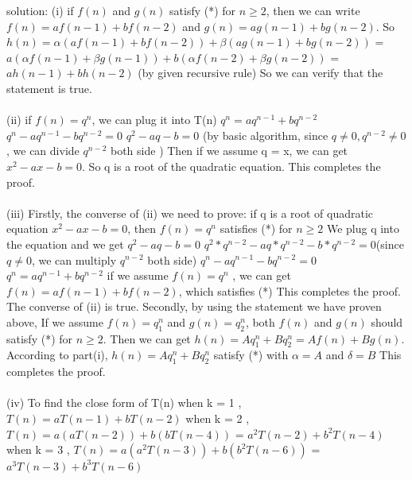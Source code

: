 \documentclass[12pt]{article}
\begin{document}
solution:\vskip5pt
(i) if $f(n)$ and $g(n)$ satisfy (*) for $n\ge 2$, then we can write $f(n) = af(n-1) + bf(n-2)$ and $g(n) = ag(n-1) + b g(n-2)$. \vskip5pt
So $h(n) = \alpha (af(n-1) + bf(n-2)) + \beta (ag(n-1) + b g(n-2)) $ \vskip5pt
\qquad  = $a(\alpha f(n-1) + \beta g(n-1)) + b(\alpha f(n-2) + \beta g(n-2))$\vskip5pt
\qquad  = $ah(n-1) + bh(n-2)$ (by given recursive rule)
So we can verify that the statement is true.
\\[2ex]
\\[2ex]
(ii) if $f(n) = q^n$, we can plug it into T(n)\vskip5pt
\qquad \qquad $q^n = aq^{n-1} + bq^{n-2}$\vskip5pt
\qquad \qquad $q^n - aq^{n-1} - bq^{n-2} = 0$ \vskip5pt
\qquad \qquad $q^2 - aq - b = 0$ (by basic algorithm, since $q \ne 0, q^{n-2} \ne 0$, we can divide $q^{n-2}$ both side )\vskip5pt
Then if we assume q = x, we can get $x^2 - ax - b = 0$. So q is a root of the quadratic equation. This completes the proof.
\\[2ex]
\\[2ex]
(iii) Firstly, the converse of (ii) we need to prove: if q is a root of quadratic equation $x^2 - ax - b = 0$, then $f(n) = q^n$ satisfies (*) for $n\ge 2$\vskip5pt
We plug q into the equation and we get $q^2 - aq - b = 0$\vskip5pt
\qquad \qquad \qquad \qquad \qquad  $q^2*q^{n-2} - aq*q^{n-2} - b*q^{n-2} = 0$(since $q \ne 0$, \vskip5pt \qquad \qquad \qquad \qquad \qquad \qquad \qquad \qquad \qquad \qquad \qquad we can multiply $q^{n-2}$ both side) \vskip5pt
\qquad \qquad \qquad \qquad \qquad  $q^n - aq^{n-1} - bq^{n-2} = 0$\vskip5pt
\qquad \qquad \qquad \qquad \qquad  $q^n = aq^{n-1} + bq^{n-2} $\vskip5pt
if we assume $f(n) = q^n$ , we can get  $f(n)= af(n-1) + bf(n-2 )$, which satisfies (*)\vskip5pt
This completes the proof. The converse of (ii) is true.\vskip5pt
Secondly, by using the statement we have proven above, If we assume $f(n) = q_1^n$ and $g(n) = q_2^n$, both $f(n)$ and $g(n)$ should satisfy (*) for $n\ge 2$.\vskip5pt
Then we can get $h(n)=Aq_1^n+Bq_2^n = Af(n) + Bg(n)$.\vskip5pt
According to part(i), $h(n)=Aq_1^n+Bq_2^n$ satisfy (*) with $\alpha = A$ and $\delta = B$\vskip5pt
This completes the proof.
\\[2ex]
\\[2ex]
(iv) To find the close form of T(n)\vskip5pt
when k = 1 , $T(n) = aT(n-1) + bT(n-2) $\vskip5pt
when k = 2 , $T(n) = a(aT(n-2)) + b(bT(n-4))$\vskip5pt
\qquad \qquad \qquad \qquad  = $a^2T(n-2) + b^2T(n-4)$\vskip5pt
when k = 3 , $T(n) = a(a^2T(n-3)) + b(b^2T(n-6))$\vskip5pt
\qquad \qquad \qquad \qquad = $a^3T(n-3) + b^3T(n-6)$\vskip5pt
\end{document}
